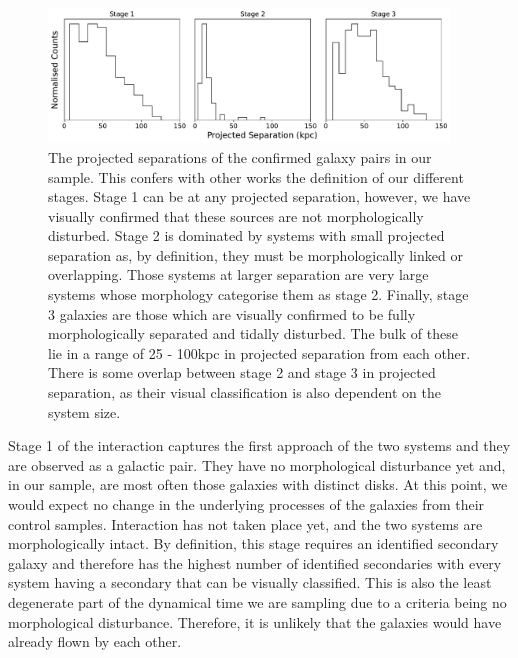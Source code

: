 \begin{figure}
    \centering
    \includegraphics[width=0.95\textwidth]{Chapter3/figures/projected-seps.pdf}
    \caption{The projected separations of the confirmed galaxy pairs in our sample. This confers with other works the definition of our different stages. Stage 1 can be at any projected separation, however, we have visually confirmed that these sources are not morphologically disturbed. Stage 2 is dominated by systems with small projected separation as, by definition, they must be morphologically linked or overlapping. Those systems at larger separation are very large systems whose morphology categorise them as stage 2. Finally, stage 3 galaxies are those which are visually confirmed to be fully morphologically separated and tidally disturbed. The bulk of these lie in a range of 25 - 100kpc in projected separation from each other. There is some overlap between stage 2 and stage 3 in projected separation, as their visual classification is also dependent on the system size.}
    \label{fig:proj-seps}
\end{figure}

Stage 1 of the interaction captures the first approach of the two systems and they are observed as a galactic pair. They have no morphological disturbance yet and, in our sample, are most often those galaxies with distinct disks. At this point, we would expect no change in the underlying processes of the galaxies from their control samples. Interaction has not taken place yet, and the two systems are morphologically intact. By definition, this stage requires an identified secondary galaxy and therefore has the highest number of identified secondaries with every system having a secondary that can be visually classified. This is also the least degenerate part of the dynamical time we are sampling due to a criteria being no morphological disturbance. Therefore, it is unlikely that the galaxies would have already flown by each other.

